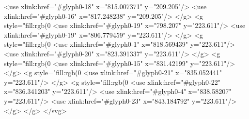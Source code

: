   <use xlink:href="#glyph0-18" x="815.007371" y="209.205"/>
  <use xlink:href="#glyph0-16" x="817.248238" y="209.205"/>
</g>
<g style="fill:rgb(0%
  <use xlink:href="#glyph0-19" x="798.207" y="223.611"/>
  <use xlink:href="#glyph0-19" x="806.779459" y="223.611"/>
</g>
<g style="fill:rgb(0%
  <use xlink:href="#glyph0-1" x="818.569439" y="223.611"/>
  <use xlink:href="#glyph0-20" x="823.391337" y="223.611"/>
</g>
<g style="fill:rgb(0%
  <use xlink:href="#glyph0-15" x="831.42199" y="223.611"/>
</g>
<g style="fill:rgb(0%
  <use xlink:href="#glyph0-21" x="835.052441" y="223.611"/>
</g>
<g style="fill:rgb(0%
  <use xlink:href="#glyph0-22" x="836.341203" y="223.611"/>
  <use xlink:href="#glyph0-4" x="838.58207" y="223.611"/>
  <use xlink:href="#glyph0-23" x="843.184792" y="223.611"/>
</g>
</g>
</svg>
